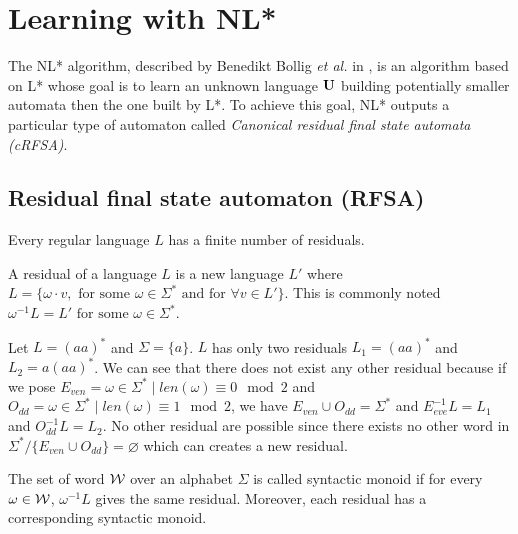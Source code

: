 \section{Learning with NL* }
\label{section:NL}

The NL* algorithm, described by Benedikt Bollig \textit{et al.} in \cite{NLPaper}, is an algorithm based on L* whose goal is to learn an unknown language $\mathbf{U}$ building potentially smaller automata then the one built by L*. To achieve this goal, NL* outputs a particular type of automaton called \textit{Canonical residual final state automata (cRFSA)}.

\subsection{Residual final state automaton (RFSA)}
\label{sec:RFSA}


\begin{theorem}
  Every regular language $L$ has a finite number of residuals.
\end{theorem}

\begin{definition}
  A residual of a language $L$ is a new language $L'$ where $L = \{\omega \cdot v, \text{ for some } \omega \in \Sigma^* \text{ and for } \forall v \in L'\}$. This is commonly noted $\omega^{-1} L = L' \text{ for some } \omega \in \Sigma^*$.
\end{definition}

\begin{example}
  \label{example:residual}
  Let $L = (aa)^*$ and $\Sigma = \{a\}$. $L$ has only two residuals $L_1 = (aa)^*$ and $L_2 = a(aa)^*$. We can see that there does not exist any other residual because if we pose $E_{ven} = {\omega \in \Sigma^* \mid len(\omega) \equiv 0 \mod 2}$ and $O_{dd} = {\omega \in \Sigma^* \mid len(\omega) \equiv 1 \mod 2}$, we have $E_{ven} \cup O_{dd} = \Sigma^*$ and $E_{eve}^{-1}L = L_1$ and $O_{dd}^{-1}L = L_2$. No other residual are possible since there exists no other word in $\Sigma^* / \{E_{ven} \cup O_{dd}\} = \varnothing$ which can creates a new residual.
\end{example}

\begin{remark}
  The set of word $\mathcal{W}$ over an alphabet $\Sigma$ is called syntactic monoid if for every $\omega \in \mathcal{W}$, $\omega^{-1}L$ gives the same residual. Moreover, each residual has a corresponding syntactic monoid.
\end{remark}

